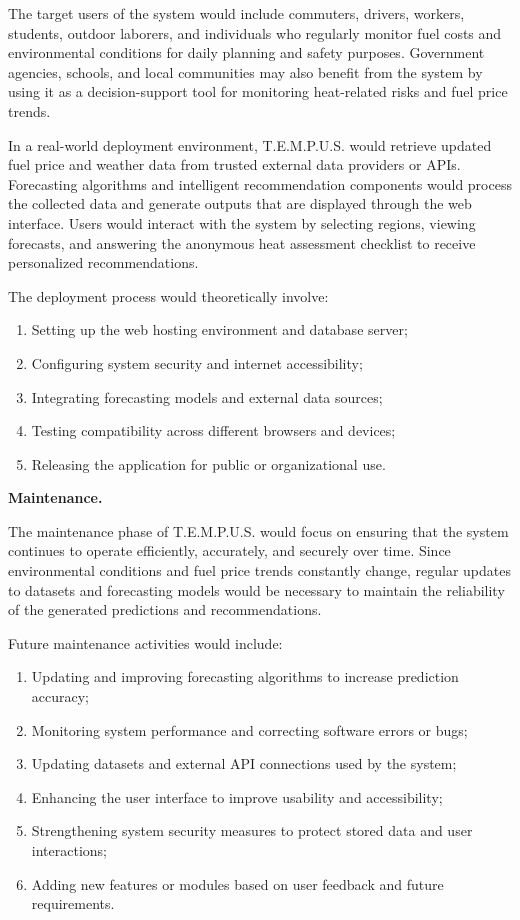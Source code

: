 \documentclass[12pt]{article}
\begin{document}
The target users of the system would include commuters, drivers, workers, students, outdoor laborers, and individuals who regularly monitor fuel costs and environmental conditions for daily planning and safety purposes. Government agencies, schools, and local communities may also benefit from the system by using it as a decision-support tool for monitoring heat-related risks and fuel price trends.

In a real-world deployment environment, T.E.M.P.U.S. would retrieve updated fuel price and weather data from trusted external data providers or APIs. Forecasting algorithms and intelligent recommendation components would process the collected data and generate outputs that are displayed through the web interface. Users would interact with the system by selecting regions, viewing forecasts, and answering the anonymous heat assessment checklist to receive personalized recommendations.

\medskip
\noindent The deployment process would theoretically involve:
\begin{enumerate}
    \item Setting up the web hosting environment and database server;
    \item Configuring system security and internet accessibility;
    \item Integrating forecasting models and external data sources;
    \item Testing compatibility across different browsers and devices;
    \item Releasing the application for public or organizational use.
\end{enumerate}

\bigskip
\noindent\textbf{Maintenance.}

The maintenance phase of T.E.M.P.U.S. would focus on ensuring that the system continues to operate efficiently, accurately, and securely over time. Since environmental conditions and fuel price trends constantly change, regular updates to datasets and forecasting models would be necessary to maintain the reliability of the generated predictions and recommendations.

\medskip
\noindent Future maintenance activities would include:
\begin{enumerate}
    \item Updating and improving forecasting algorithms to increase prediction accuracy;
    \item Monitoring system performance and correcting software errors or bugs;
    \item Updating datasets and external API connections used by the system;
    \item Enhancing the user interface to improve usability and accessibility;
    \item Strengthening system security measures to protect stored data and user interactions;
    \item Adding new features or modules based on user feedback and future requirements.
\end{enumerate}
\end{document}
